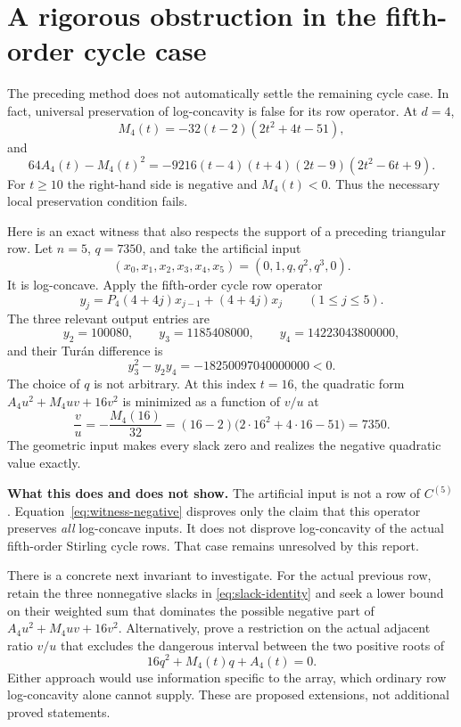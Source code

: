 \documentclass[11pt,a4paper]{article}
\numberwithin{equation}{section}
\theoremstyle{definition}
\theoremstyle{remark}
\newcommand{\Turan}{Tur\'an}
\begin{document}
\section{A rigorous obstruction in the fifth-order cycle case}\label{sec:obstruction}

The preceding method does not automatically settle the remaining cycle
case. In fact, universal preservation of log-concavity is false for its
row operator. At $d=4$,
\begin{equation}\label{eq:M4}
 M_4(t)=-32(t-2)(2t^2+4t-51),
\end{equation}
and
\begin{equation}\label{eq:cycle5-discriminant}
 \boxed{64A_4(t)-M_4(t)^2
       =-9216(t-4)(t+4)(2t-9)(2t^2-6t+9).}
\end{equation}
For $t\ge10$ the right-hand side is negative and $M_4(t)<0$.
Thus the necessary local preservation condition fails.

Here is an exact witness that also respects the support of a preceding
triangular row. Let $n=5$, $q=7350$, and take the artificial input
\[
 (x_0,x_1,x_2,x_3,x_4,x_5)=(0,1,q,q^2,q^3,0).
\]
It is log-concave. Apply the fifth-order cycle row operator
\[
 y_j=P_4(4+4j)x_{j-1}+(4+4j)x_j\qquad(1\le j\le5).
\]
The three relevant output entries are
\begin{equation}\label{eq:witness-values}
 y_2=100080,\qquad y_3=1185408000,\qquad y_4=14223043800000,
\end{equation}
and their \Turan{} difference is
\begin{equation}\label{eq:witness-negative}
 y_3^2-y_2y_4=-18250097040000000<0.
\end{equation}
The choice of $q$ is not arbitrary. At this index $t=16$, the quadratic
form $A_4u^2+M_4uv+16v^2$ is minimized as a function of $v/u$ at
\[
 \frac vu=-\frac{M_4(16)}{32}
       =(16-2)\bigl(2\cdot16^2+4\cdot16-51\bigr)=7350.
\]
The geometric input makes every slack zero and realizes the negative
quadratic value exactly.

\begin{tcolorbox}
\textbf{What this does and does not show.}
The artificial input is not a row of $C^{(5)}$.
Equation~\eqref{eq:witness-negative} disproves only the claim that this
operator preserves \emph{all} log-concave inputs. It does not disprove
log-concavity of the actual fifth-order Stirling cycle rows.
That case remains unresolved by this report.
\end{tcolorbox}

There is a concrete next invariant to investigate. For the actual previous
row, retain the three nonnegative slacks in \eqref{eq:slack-identity}
and seek a lower bound on their weighted sum that dominates the possible
negative part of $A_4u^2+M_4uv+16v^2$. Alternatively, prove a restriction
on the actual adjacent ratio $v/u$ that excludes the dangerous interval
between the two positive roots of
\[
 16q^2+M_4(t)q+A_4(t)=0.
\]
Either approach would use information specific to the array, which
ordinary row log-concavity alone cannot supply. These are proposed
extensions, not additional proved statements.
\end{document}
